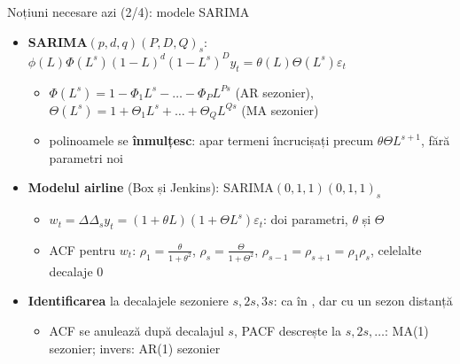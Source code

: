 \begin{frame}{Noțiuni necesare azi (2/4): modele SARIMA}
\itemsize{\small}
\begin{itemize}
    \item \textbf{SARIMA$(p,d,q)(P,D,Q)_s$}: $\phi(L)\Phi(L^s)(1 - L)^d(1 - L^s)^D y_t = \theta(L)\Theta(L^s)\varepsilon_t$
    \begin{itemize}
        \item $\Phi(L^s) = 1 - \Phi_1L^s - \dots - \Phi_PL^{Ps}$ (AR sezonier), $\Theta(L^s) = 1 + \Theta_1L^s + \dots + \Theta_QL^{Qs}$ (MA sezonier)
        \item polinoamele se \textbf{înmulțesc}: apar termeni încrucișați precum $\theta\Theta L^{s+1}$, fără parametri noi
    \end{itemize}
    \item \textbf{Modelul airline} (Box și Jenkins): SARIMA$(0,1,1)(0,1,1)_s$
    \begin{itemize}
        \item $w_t = \Delta\Delta_s y_t = (1 + \theta L)(1 + \Theta L^s)\varepsilon_t$: doi parametri, $\theta$ și $\Theta$
        \item ACF pentru $w_t$: $\rho_1 = \frac{\theta}{1 + \theta^2}$, $\rho_s = \frac{\Theta}{1 + \Theta^2}$, $\rho_{s-1} = \rho_{s+1} = \rho_1\rho_s$, celelalte decalaje 0
    \end{itemize}
    \item \textbf{Identificarea} la decalajele sezoniere $s, 2s, 3s$: ca în , dar cu un sezon distanță
    \begin{itemize}
        \item ACF se anulează după decalajul $s$, PACF descrește la $s, 2s, \dots$: MA(1) sezonier; invers: AR(1) sezonier
    \end{itemize}
\end{itemize}
\end{frame}

